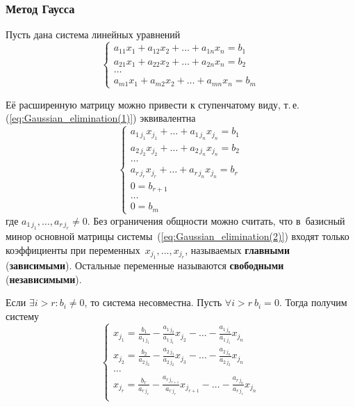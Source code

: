 \subsubsection{Метод Гаусса}
Пусть дана система линейных уравнений
\begin{equation}
\label{eq:Gaussian_elimination(1)}
\begin{cases}
a_{11} x_1 + a_{12} x_2 + \dots + a_{1n} x_n = b_1 \\
a_{21} x_1 + a_{22} x_2 + \dots + a_{2n} x_n = b_2 \\
\ldots \\
a_{m1} x_1 + a_{m2} x_2 + \dots + a_{mn} x_n = b_m
\end{cases}
\end{equation}

Её расширенную матрицу можно привести к ступенчатому виду, т.\,е. (\ref*{eq:Gaussian_elimination(1)}) эквивалентна
\begin{equation}
\label{eq:Gaussian_elimination(2)}
\begin{cases}
a_{1\, j_1} x_{j_1} + \ldots + a_{1\, j_n} x_{j_n} = b_1 \\
a_{2\, j_2} x_{j_2} + \ldots + a_{2\, j_n} x_{j_n} = b_2 \\
\ldots \\
a_{r\, j_r} x_{j_r} + \ldots + a_{r\, j_n} x_{j_n} = b_r \\
0 = b_{r+1} \\
\ldots \\
0 = b_m
\end{cases}
\end{equation}
где $a_{1\, j_1}, \ldots, a_{r\, j_r} \neq 0$.
Без ограничения общности можно считать, что в~базисный минор основной матрицы системы~(\ref*{eq:Gaussian_elimination(2)}) входят только коэффициенты при переменных~$x_{j_1}, \ldots, x_{j_r}$, называемых \textbf{главными} (\textbf{зависимыми}).
Остальные переменные называются \textbf{свободными} (\textbf{независимыми}).

Если $\exists i > r \colon b_i \neq 0$, то система несовместна.
Пусть $\forall i > r \ b_i = 0$. Тогда получим систему
\begin{equation*}
\begin{cases}
\displaystyle x_{j_1} = \frac{b_1}{a_{1\, j_1}} - \frac{a_{1\, j_2}}{a_{1\, j_1}} x_{j_2} - \ldots - \frac{a_{1\, j_n}}{a_{1\, j_1}} x_{j_n} \\
\displaystyle x_{j_2} = \frac{b_2}{a_{2\, j_2}} - \frac{a_{2\, j_3}}{a_{2\, j_2}} x_{j_3} - \ldots - \frac{a_{2\, j_n}}{a_{2\, j_2}} x_{j_n} \\
\ldots \\
\displaystyle x_{j_r} = \frac{b_r}{a_{r\, j_r}} - \frac{a_{r\, j_{r+1}}}{a_{r\, j_r}} x_{j_{r+1}} - \ldots - \frac{a_{r\, j_n}}{a_{r\, j_r}} x_{j_n} \\
\end{cases}
\end{equation*}


